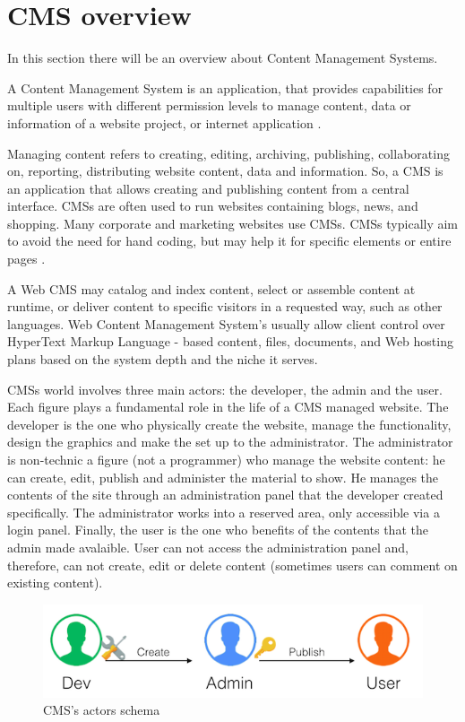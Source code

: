 \section{CMS overview}
\label{sec:CMS_overview}

In this section there will be an overview about Content Management Systems.

A Content Management System is an application, that provides capabilities for multiple users with different permission levels to manage content, data or information of a website project, or internet application \cite{cms_def}.

Managing content refers to creating, editing, archiving, publishing, collaborating on, reporting, distributing website content, data and information.
So, a CMS is an application that allows creating and publishing content from a central interface. CMSs are often used to run websites containing blogs, news, and shopping. Many corporate and marketing websites use CMSs. CMSs typically aim to avoid the need for hand coding, but may help it for specific elements or entire pages \cite{cms_over}. 

A Web CMS may catalog and index content, select or assemble content at runtime, or deliver content to specific visitors in a requested way, such as other languages. Web Content Management System's usually allow client control over HyperText Markup Language - based content, files, documents, and Web hosting plans based on the system depth and the niche it serves.


CMSs world involves three main actors: the developer, the admin and the user. Each figure plays a fundamental role in the life of a CMS managed website. The developer is the one who physically create the website, manage the functionality, design the graphics and make the set up to the administrator.
The administrator is non-technic a figure (not a programmer) who manage the website content: he can create, edit, publish and administer the material to show.
He manages the contents of the site through an administration panel that the developer created specifically. The administrator works into a reserved area, only accessible via a login panel.
Finally, the user is the one who benefits of the contents that the admin made avalaible. User can not access the administration panel and, therefore, can not create, edit or delete content (sometimes users can comment on existing content).

\begin {figure}[h]
\graphicspath{{images/chapter_cms/}}
\includegraphics[width=\textwidth]{cms_schema}
\caption{CMS's actors schema}
\end {figure}


